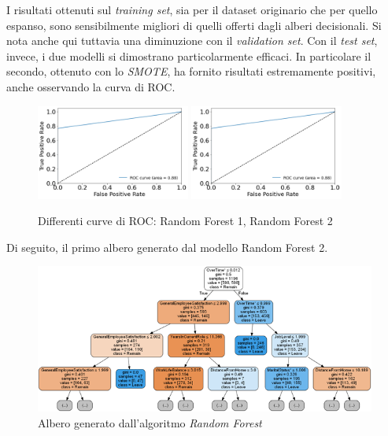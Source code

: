 \noindent I risultati ottenuti sul \textit{training set}, sia per il dataset originario che per quello espanso, sono sensibilmente migliori di quelli offerti dagli alberi decisionali. Si nota anche qui tuttavia una diminuzione con il \textit{validation set}.
Con il \textit{test set}, invece, i due modelli si dimostrano particolarmente efficaci. In particolare il secondo, ottenuto con lo \textit{SMOTE}, ha fornito risultati estremamente positivi, anche osservando la curva di ROC.
\begin{figure}[H]
    \centering
    \includegraphics[width=0.45\textwidth]{Immagini/ROCR1.png}
    \includegraphics[width=0.45\textwidth]{Immagini/ROCR2.png}
    \caption{Differenti curve di ROC: Random Forest 1, Random Forest 2}
    \label{fig:ROC2}
\end{figure}
Di seguito, il primo albero generato dal modello Random Forest 2.
\begin{figure}[H]
    \centering
    \small
    \includegraphics[scale=0.9]{Immagini/alberoRandomForest.png}
    \caption{Albero generato dall'algoritmo \textit{Random Forest}}
    \label{fig:alberoRandomForest}
\end{figure}
